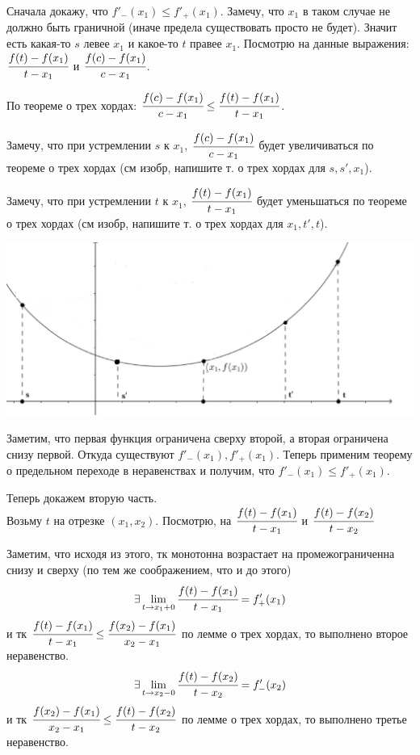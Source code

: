 Сначала докажу, что $f'_-(x_1)\leq f'_+(x_1)$. Замечу, что $x_1$ в таком случае не должно быть граничной (иначе предела существовать просто не будет). Значит есть какая-то $s$ левее $x_1$ и какое-то $t$ правее $x_1$. Посмотрю на данные выражения:
$\cfrac{f(t)-f(x_1)}{t-x_1}$ и $\cfrac{f(c)-f(x_1)}{c-x_1}$. 

По теореме о трех хордах: $\cfrac{f(c)-f(x_1)}{c-x_1} \leq \cfrac{f(t)-f(x_1)}{t-x_1}$.

Замечу, что при устремлении $s$ к $x_1$,  $\cfrac{f(c)-f(x_1)}{c-x_1}$ будет увеличиваться по теореме о трех хордах (см изобр, напишите т. о трех хордах для $s,s',x_1$).

Замечу, что при устремлении $t$ к $x_1$,  $\cfrac{f(t)-f(x_1)}{t-x_1}$ будет  уменьшаться по теореме о трех хордах (см изобр, напишите т. о трех хордах для $x_1,t',t$).


\begin{center}
 \includegraphics[width = 15cm]{assets/integral_1.png}
\end{center}

Заметим, что первая функция ограничена сверху второй, а вторая ограничена снизу первой. Откуда существуют  $f'_-(x_1), f'_+(x_1)$. Теперь применим теорему о предельном переходе в неравенствах и получим, что $f'_-(x_1)\leq f'_+(x_1)$.

Теперь докажем вторую часть.\\
Возьму $t$ на отрезке $(x_1,x_2)$. Посмотрю, на  $\cfrac{f(t)-f(x_1)}{t-x_1}$ и $\cfrac{f(t)-f(x_2)}{t-x_2}$

Заметим, что исходя из этого, тк монотонна возрастает на промежограниченна снизу и сверху (по тем же соображением, что и до этого)
$$\exists  \lim\limits_{t \rightarrow x_1 + 0}\cfrac{f(t)-f(x_1)}{t-x_1} = f'_+(x_1)$$ и тк $\cfrac{f(t)-f(x_1)}{t-x_1}\leq\cfrac{f(x_2)-f(x_1)}{x_2-x_1}$ по лемме о трех хордах, то выполнено второе неравенство.
$$\exists  \lim\limits_{t \rightarrow x_2 - 0}\cfrac{f(t)-f(x_2)}{t-x_2} = f'_-(x_2)$$ и тк $ \cfrac{f(x_2)-f(x_1)}{x_2-x_1}\leq \cfrac{f(t)-f(x_2)}{t-x_2}$ по лемме о трех хордах, то выполнено третье неравенство.

